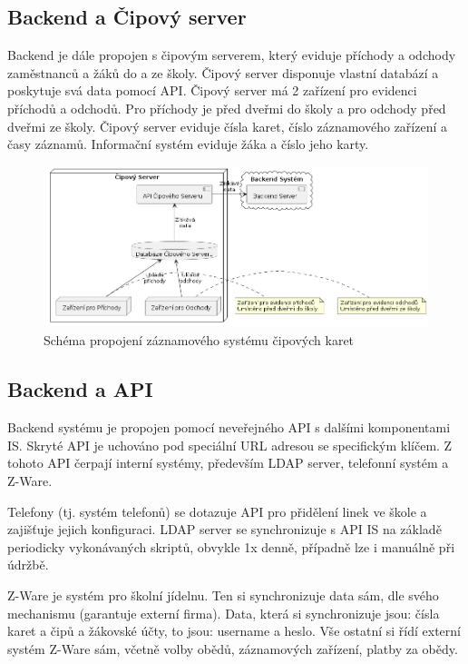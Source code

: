 \documentclass[FM,Proj]{tulthesis}
\begin{document}
\subsection*{Backend a Čipový server}
Backend je dále propojen s čipovým serverem, který eviduje příchody a odchody zaměstnanců a
žáků do a ze školy. Čipový server disponuje vlastní databází a poskytuje svá data pomocí API.
Čipový server má 2 zařízení pro evidenci příchodů a odchodů. Pro příchody je před dveřmi do školy
a pro odchody před dveřmi ze školy.  
Čipový server eviduje čísla karet, číslo záznamového zařízení a časy záznamů. 
Informační systém eviduje žáka a číslo jeho karty. 


\begin{figure}[H]
    \includegraphics[width=\textwidth-28pt]{backend-cipovy-server.png}
    \caption{Schéma propojení záznamového systému čipových karet}
    \label{fig:backend-cipovy-server}
\end{figure}

\subsection*{Backend a API}
Backend systému je propojen pomocí neveřejného API s dalšími komponentami IS. Skryté API je 
uchováno pod speciální URL adresou se specifickým klíčem. Z tohoto API čerpají interní systémy,
především LDAP server, telefonní systém a Z-Ware.

Telefony (tj. systém telefonů) se dotazuje API pro přidělení linek ve škole a zajišťuje 
jejich konfiguraci. LDAP server se synchronizuje s API IS na základě periodicky vykonávaných
skriptů, obvykle 1x denně, případně lze i manuálně při údržbě.

Z-Ware je systém pro školní jídelnu. Ten si synchronizuje data sám, dle svého mechanismu
(garantuje externí firma). Data, která si synchronizuje jsou: čísla karet a čipů a žákovské 
účty, to jsou: username a heslo. Vše ostatní si řídí externí systém Z-Ware sám, včetně volby
obědů, záznamových zařízení, platby za obědy.
\end{document}
